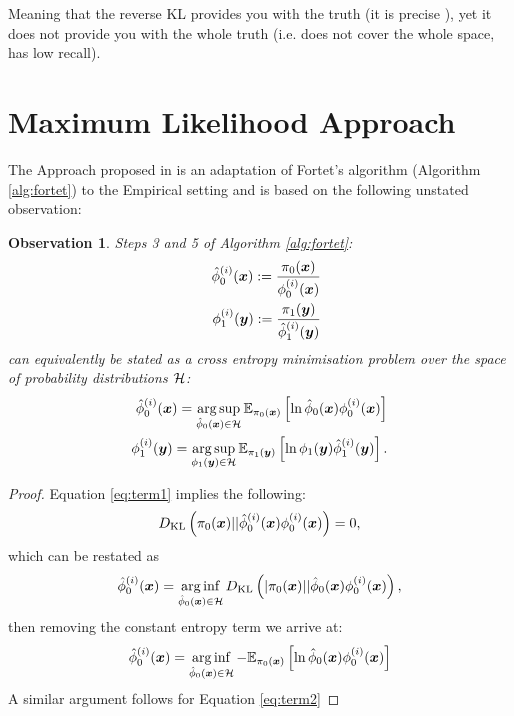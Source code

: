 \documentclass[a4paper,12pt,twoside,openright]{report}
\newtheorem{observation}[theorem]{Observation}
\theoremstyle{definition}
\begin{document}
Meaning that the reverse KL provides you with the truth (it is precise ), yet  it does not provide you with the whole truth (i.e. does not cover the whole space, has low recall).


\section{Maximum Likelihood Approach \citep{pavon2018data}}

The Approach proposed in \cite{pavon2018data} is an adaptation of Fortet's algorithm (Algorithm \ref{alg:fortet}) to the Empirical setting and is based on the following unstated observation:
\begin{observation}\label{obs:pavon}
Steps 3 and 5 of Algorithm \ref{alg:fortet}:
\begin{align}
    {\hat{\phi}}_0^{(i)}({\bm{x}}) := \frac{\pi_0({\bm{x}})}{\phi_0^{(i)}({\bm{x}})} \label{eq:term1}\\    \quad \phi_1^{(i)}({\bm{y}}) := \frac{\pi_1({\bm{y}})}{{\hat{\phi}}_1^{(i)}({\bm{y}})}  \label{eq:term2}
\end{align}
can equivalently be stated as a cross entropy minimisation problem over the space of probability distributions ${\mathcal{H}}$:
\begin{align} \label{eq:pavon_cros_ent}
   {\hat{\phi}}_0^{(i)}({\bm{x}})= \operatorname*{arg\,sup}_{{\hat{\phi}}_0({\bm{x}}) \in {\mathcal{H}}} \mathbb{E}_{\pi_0({\bm{x}})} \left[\operatorname{ln} {\hat{\phi}}_0({\bm{x}})   \phi_0^{(i)}({\bm{x}})\right]\\
   \phi_1^{(i)}({\bm{y}})= \operatorname*{arg\,sup}_{\phi_1({\bm{y}}) \in {\mathcal{H}}} \mathbb{E}_{\pi_1({\bm{y}})} \left[\operatorname{ln} \phi_1({\bm{y}})   {\hat{\phi}}_1^{(i)}({\bm{y}})\right].
\end{align}
\end{observation}
\begin{proof}
Equation \ref{eq:term1}  implies the following:
\begin{align}\label{eq:zero}
    D_{\mathrm{KL}}\left(\pi_0({\bm{x}}) || {\hat{\phi}}_0^{(i)}({\bm{x}})   \phi_0^{(i)}({\bm{x}}) \right)  = 0 ,
\end{align} 
which can be restated as
\begin{align}
   {\hat{\phi}}_0^{(i)}({\bm{x}}) = \operatorname*{arg\,inf}_{{\hat{\phi}}_0({\bm{x}})\in \mathcal{H}} D_{\mathrm{KL}}\left(|\pi_0({\bm{x}}) || {\hat{\phi}}_0({\bm{x}})   \phi_0^{(i)}({\bm{x}}) \right),  
\end{align} 
then removing the constant entropy term we arrive at:
\begin{align*}
   {\hat{\phi}}_0^{(i)}({\bm{x}})= \operatorname*{arg\,inf}_{{\hat{\phi}}_0({\bm{x}}) \in {\mathcal{H}}} -\mathbb{E}_{\pi_0({\bm{x}})} \left[\operatorname{ln} {\hat{\phi}}_0({\bm{x}})   \phi_0^{(i)}({\bm{x}})\right]
\end{align*}
A similar argument follows for Equation \ref{eq:term2}
\end{proof}
\end{document}
